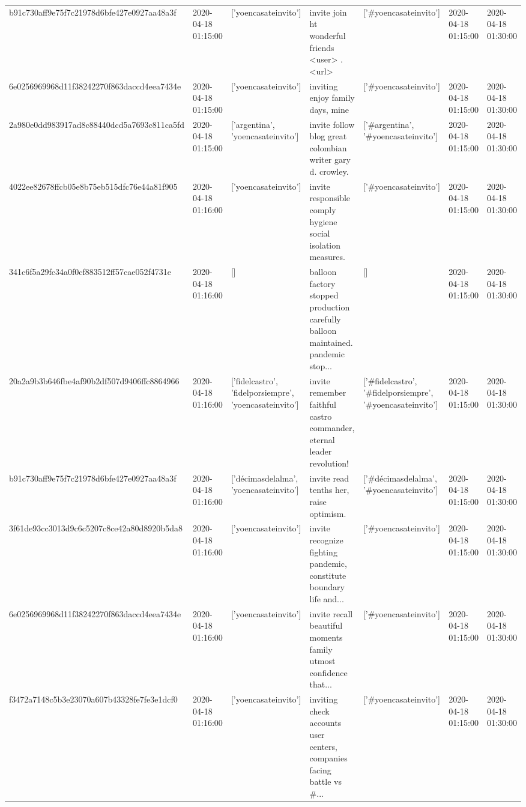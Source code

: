 \begin{tabular}{lllllll}
b91c730aff9e75f7c21978d6bfe427e0927aa48a3f & 2020-04-18 01:15:00 & ['yoencasateinvito'] & invite join ht wonderful friends <user> . <url> & ['#yoencasateinvito'] & 2020-04-18 01:15:00 & 2020-04-18 01:30:00 \\
6e0256969968d11f38242270f863daccd4eea7434e & 2020-04-18 01:15:00 & ['yoencasateinvito'] & inviting enjoy family days, mine & ['#yoencasateinvito'] & 2020-04-18 01:15:00 & 2020-04-18 01:30:00 \\
2a980e0dd983917ad8c88440dcd5a7693c811ca5fd & 2020-04-18 01:15:00 & ['argentina', 'yoencasateinvito'] & invite follow blog great colombian writer gary d. crowley. & ['#argentina', '#yoencasateinvito'] & 2020-04-18 01:15:00 & 2020-04-18 01:30:00 \\
4022ee82678ffcb05e8b75eb515dfc76e44a81f905 & 2020-04-18 01:16:00 & ['yoencasateinvito'] & invite responsible comply hygiene social isolation measures. & ['#yoencasateinvito'] & 2020-04-18 01:15:00 & 2020-04-18 01:30:00 \\
341c6f5a29fc34a0f0cf883512ff57cae052f4731e & 2020-04-18 01:16:00 & [] & balloon factory stopped production carefully balloon maintained. pandemic stop... & [] & 2020-04-18 01:15:00 & 2020-04-18 01:30:00 \\
20a2a9b3b646fbe4af90b2df507d9406ffc8864966 & 2020-04-18 01:16:00 & ['fidelcastro', 'fidelporsiempre', 'yoencasateinvito'] & invite remember faithful castro commander, eternal leader revolution! & ['#fidelcastro', '#fidelporsiempre', '#yoencasateinvito'] & 2020-04-18 01:15:00 & 2020-04-18 01:30:00 \\
b91c730aff9e75f7c21978d6bfe427e0927aa48a3f & 2020-04-18 01:16:00 & ['décimasdelalma', 'yoencasateinvito'] & invite read tenths her, raise optimism. & ['#décimasdelalma', '#yoencasateinvito'] & 2020-04-18 01:15:00 & 2020-04-18 01:30:00 \\
3f61de93cc3013d9c6c5207c8ce42a80d8920b5da8 & 2020-04-18 01:16:00 & ['yoencasateinvito'] & invite recognize fighting pandemic, constitute boundary life and... & ['#yoencasateinvito'] & 2020-04-18 01:15:00 & 2020-04-18 01:30:00 \\
6e0256969968d11f38242270f863daccd4eea7434e & 2020-04-18 01:16:00 & ['yoencasateinvito'] & invite recall beautiful moments family utmost confidence that... & ['#yoencasateinvito'] & 2020-04-18 01:15:00 & 2020-04-18 01:30:00 \\
f3472a7148c5b3e23070a607b43328fe7fe3e1dcf0 & 2020-04-18 01:16:00 & ['yoencasateinvito'] & inviting check accounts user centers, companies facing battle vs \#... & ['#yoencasateinvito'] & 2020-04-18 01:15:00 & 2020-04-18 01:30:00 \\

\end{tabular}
